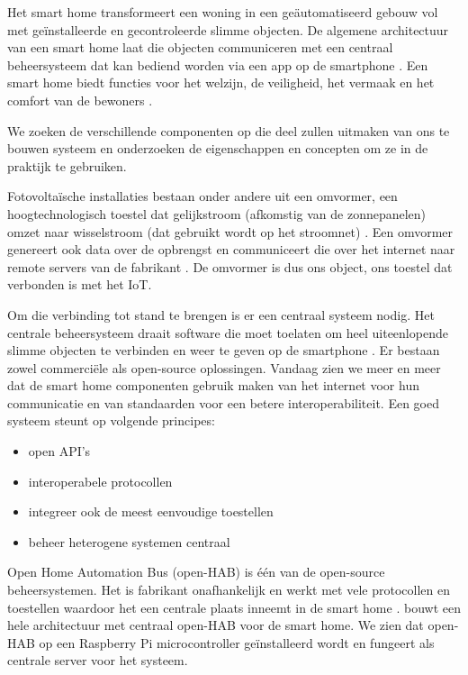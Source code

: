 \documentclass{hogent-article}
\begin{document}
    Het smart home transformeert een woning in een geäutomatiseerd gebouw vol met geïnstalleerde en gecontroleerde slimme objecten. De algemene architectuur van een smart home laat die objecten communiceren met een centraal beheersysteem dat kan bediend worden via een app op de smartphone \autocite{Kassab2020}. Een smart home biedt functies voor het welzijn, de veiligheid, het vermaak en het comfort van de bewoners \autocite{Choi2021}.

    We zoeken de verschillende componenten op die deel zullen uitmaken van ons te bouwen systeem en onderzoeken de eigenschappen en concepten om ze in de praktijk te gebruiken.
    
    Fotovoltaïsche installaties bestaan onder andere uit een omvormer, een hoogtechnologisch toestel dat gelijkstroom (afkomstig van de zonnepanelen) omzet naar wisselstroom (dat gebruikt wordt op het stroomnet) \autocite{Teodorescu2011}. Een omvormer genereert ook data over de opbrengst en communiceert die over het internet naar remote servers van de fabrikant \autocite{Fusionsolar2021}. De omvormer is dus ons object, ons toestel dat verbonden is met het IoT.
    
    Om die verbinding tot stand te brengen is er een centraal systeem nodig. Het centrale beheersysteem draait software die moet toelaten om heel uiteenlopende slimme objecten te verbinden en weer te geven op de smartphone \autocite{Setz2021}. Er bestaan zowel commerciële als open-source oplossingen. Vandaag zien we meer en meer dat de smart home componenten gebruik maken van het internet voor hun communicatie en van standaarden voor een betere interoperabiliteit. Een goed systeem steunt op volgende principes: \begin{itemize}
        \item open API's
        \item interoperabele protocollen
        \item integreer ook de meest eenvoudige toestellen
        \item beheer heterogene systemen centraal
    \end{itemize}

    Open Home Automation Bus (open-HAB) is één van de open-source beheersystemen. Het is fabrikant onafhankelijk en werkt met vele protocollen en toestellen waardoor het een centrale plaats inneemt in de smart home \autocite{Domb2019}. \textcite{Sowah2020} bouwt een hele architectuur met centraal open-HAB voor de smart home. We zien dat open-HAB op een Raspberry Pi microcontroller geïnstalleerd wordt en fungeert als centrale server voor het systeem.
    
\end{document}

